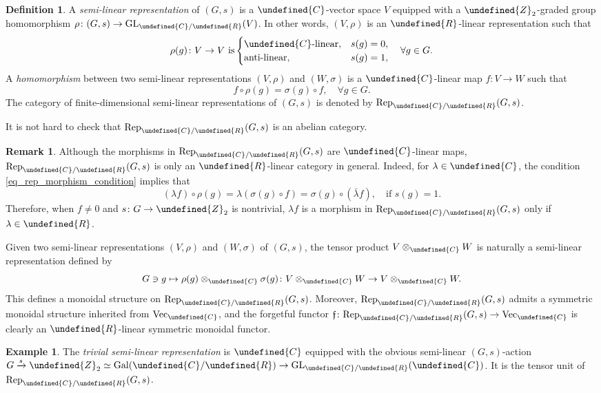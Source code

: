 \documentclass[10pt]{article}
\let\mathbb\undefined
\theoremstyle{definition}
\newtheorem{defn}[thm]{Definition}
\newtheorem{expl}[thm]{Example}
\newtheorem{rem}[thm]{Remark}
\numberwithin{equation}{section}
\numberwithin{thm}{section}
\newcommand{\Cb}{\mathbb{C}}
\newcommand{\Rb}{\mathbb{R}}
\newcommand{\Zb}{\mathbb{Z}}
\DeclareMathOperator{\Gal}{Gal}
\newcommand{\forget}{\text{\usefont{U}{euf}{m}{n}f}}
\newcommand{\vect}{\mathrm{Vec}}
\newcommand{\rep}{\mathrm{Rep}}
\begin{document}
\begin{defn}
A \emph{semi-linear representation} of $(G,s)$ is a $\Cb$-vector space $V$ equipped with a $\Zb_2$-graded group homomorphism $\rho \colon (G,s) \to \mathrm{GL}_{\Cb/\Rb}(V)$. In other words, $(V,\rho)$ is an $\Rb$-linear representation such that
\[
\rho(g) \colon V \to V \text{ is} \begin{cases}
\text{$\Cb$-linear} , &  s(g) = 0 , \\
\text{anti-linear} , & s(g) = 1 ,
\end{cases} \quad \forall g \in G .
\]
A \emph{homomorphism} between two semi-linear representations $(V,\rho)$ and $(W,\sigma)$ is a $\Cb$-linear map $f \colon V \to W$ such that
\begin{equation} \label{eq_rep_morphism_condition}
f \circ \rho(g) = \sigma(g) \circ f , \quad \forall g \in G .
\end{equation}
The category of finite-dimensional semi-linear representations of $(G,s)$ is denoted by $\rep_{\Cb/\Rb}(G,s)$.
\end{defn}

It is not hard to check that $\rep_{\Cb/\Rb}(G,s)$ is an abelian category.

\begin{rem}
Although the morphisms in $\rep_{\Cb/\Rb}(G,s)$ are $\Cb$-linear maps, $\rep_{\Cb/\Rb}(G,s)$ is only an $\Rb$-linear category in general. Indeed, for $\lambda \in \Cb$, the condition \eqref{eq_rep_morphism_condition} implies that
\[
(\lambda f) \circ \rho(g) = \lambda (\sigma(g) \circ f) =  \sigma(g) \circ (\bar{\lambda} f) , \quad \text{if } s(g) = 1 .
\]
Therefore, when $f \neq 0$ and $s \colon G \to \Zb_2$ is nontrivial, $\lambda f$ is a morphism in $\rep_{\Cb/\Rb}(G,s)$ only if $\lambda \in \Rb$.
\end{rem}

Given two semi-linear representations $(V,\rho)$ and $(W,\sigma)$ of $(G,s)$, the tensor product $V \otimes_\Cb W$ is naturally a semi-linear representation defined by
\[
G \ni g \mapsto \rho(g) \otimes_\Cb \sigma(g) \colon V \otimes_\Cb W \to V \otimes_\Cb W .
\]
This defines a monoidal structure on $\rep_{\Cb/\Rb}(G,s)$. Moreover, $\rep_{\Cb/\Rb}(G,s)$ admits a symmetric monoidal structure inherited from $\vect_\Cb$, and the forgetful functor $\forget \colon \rep_{\Cb/\Rb}(G,s) \to \vect_\Cb$ is clearly an $\Rb$-linear symmetric monoidal functor.

\begin{expl}
The \emph{trivial semi-linear representation} is $\Cb$ equipped with the obvious semi-linear $(G,s)$-action $G \xrightarrow{s} \Zb_2 \simeq \Gal(\Cb/\Rb) \to \mathrm{GL}_{\Cb/\Rb}(\Cb)$. It is the tensor unit of $\rep_{\Cb/\Rb}(G,s)$.
\end{expl}
\end{document}
